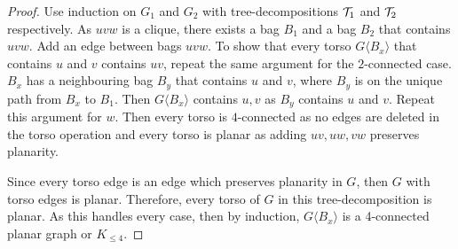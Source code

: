 \begin{proof}
	Use induction on $G_1$ and $G_2$ with tree-decompositions $\mathcal{T}_1$ and $\mathcal{T}_2$ respectively. As $uvw$ is a clique, there exists a bag $B_1$ and a bag $B_2$ that contains $uvw$. Add an edge between bags $uvw$. To show that every torso $G\langle B_x \rangle$ that contains $u$ and $v$ contains $uv$, repeat the same argument for the $2$-connected case. $B_x$ has a neighbouring bag $B_y$ that contains $u$ and $v$, where $B_y$ is on the unique path from $B_x$ to $B_1$. Then $G\langle B_x \rangle$ contains $u, v$ as $B_y$ contains $u$ and $v$. Repeat this argument for $w$. Then every torso is $4$-connected as no edges are deleted in the torso operation and every torso is planar as adding $uv, uw, vw$ preserves planarity. 

	Since every torso edge is an edge which preserves planarity in $G$, then $G$ with torso edges is planar. Therefore, every torso of $G$ in this tree-decomposition is planar.
	As this handles every case, then by induction, $G \langle B_x \rangle$ is a 4-connected planar graph or $K_{\leq 4}$. 
\end{proof}